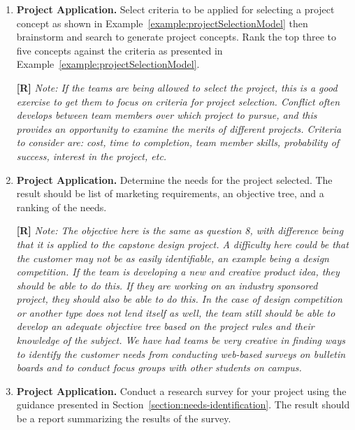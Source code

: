 \begin{enumerate}
\item
  \textbf{Project Application.} Select criteria to be applied for
  selecting a project concept as shown in Example~\ref{example:projectSelectionModel}
  then brainstorm and search to generate project concepts. Rank the top three to five
  concepts against the criteria as presented in Example~\ref{example:projectSelectionModel}.

  \begin{onlysolution}
  \textbf{[R]}
  \itshape
  \emph{Note:} If the teams are being allowed to select the project, this is a good exercise 
  to get them to focus on criteria for project selection. Conflict often develops between 
  team members over which project to pursue, and this provides an opportunity to examine the 
  merits of different projects. Criteria to consider are: cost, time to completion, team member 
  skills, probability of success, interest in the project, etc.
  \end{onlysolution}

\item
  \textbf{Project Application.} Determine the needs for the project
  selected. The result should be list of marketing requirements, an
  objective tree, and a ranking of the needs.

  \begin{onlysolution}
  \textbf{[R]}
  \itshape
  \emph{Note:} The objective here is the same as question 8, with difference being that it 
  is applied to the capstone design project. A difficulty here could be that the customer may 
  not be as easily identifiable, an example being a design competition. If the team is developing 
  a new and creative product idea, they should be able to do this. If they are working on an 
  industry sponsored project, they should also be able to do this. In the case of design competition
  or another type does not lend itself as well, the team still should be able to develop an adequate 
  objective tree based on the project rules and their knowledge of the subject. We have had teams be 
  very creative in finding ways to identify the customer needs from conducting web-based surveys on 
  bulletin boards and to conduct focus groups with other students on campus.
  \end{onlysolution}

\item
  \textbf{Project Application.} Conduct a research survey for your
  project using the guidance presented in Section~\ref{section:needs-identification}. The result should
  be a report summarizing the results of the survey.


\end{enumerate}

